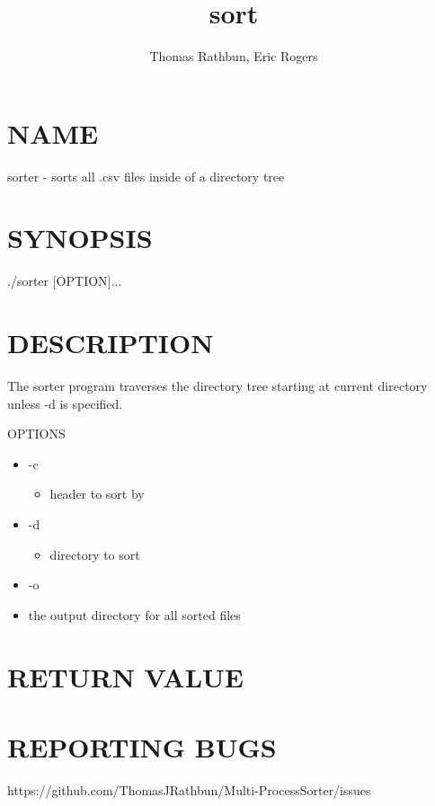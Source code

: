 \documentclass{article}
\title{sort}
\author{Thomas Rathbun, Eric Rogers}
\date{}
\begin{document}
\begin{titlepage}
\maketitle
\end{titlepage}

\section{NAME}
\begin{center}
sorter - sorts all .csv files inside of a directory tree  
\end{center}

\section{SYNOPSIS}
\begin{center} 
./sorter [OPTION]... 
\end{center}

\section{DESCRIPTION}
\begin{center} 
The sorter program traverses the directory tree starting at current
directory unless -d is specified.

OPTIONS
\begin{itemize}
\item -c
\begin{itemize}
\item header to sort by
\end{itemize}
\item -d
\begin{itemize}
\item directory to sort
\end{itemize}
\item -o
\begin{itemize}
\end{itemize}
\item the output directory for all sorted files
\end{itemize}

\end{center}

\section{RETURN VALUE}



\section{REPORTING BUGS}
\begin{center}
https://github.com/ThomasJRathbun/Multi-ProcessSorter/issues
\end{center}
\end{document}
